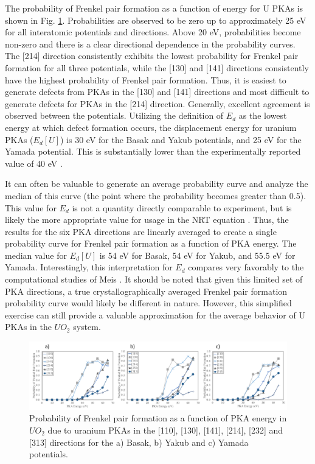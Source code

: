 \documentclass[8pt]{article}   	%
\begin{document}
The probability of Frenkel pair formation as a function of energy for U PKAs is shown in Fig. \ref{fig:fpu}. Probabilities are observed to be zero up to approximately 25 eV for all interatomic potentials and directions. Above 20 eV, probabilities become non-zero and there is a clear directional dependence in the probability curves. The [214] direction consistently exhibits the lowest probability for Frenkel pair formation for all three potentials, while the [130] and [141] directions consistently have the highest probability of Frenkel pair formation. Thus, it is easiest to generate defects from PKAs in the [130] and [141] directions and most difficult to generate defects for PKAs in the [214] direction. Generally, excellent agreement is observed between the potentials. Utilizing the definition of $E_d$ as the lowest energy at which defect formation occurs, the displacement energy for uranium PKAs ($E_d [U]$) is 30 eV for the Basak and Yakub potentials, and 25 eV for the Yamada potential. This is substantially lower than the experimentally reported value of 40 eV \cite{soullard1977,soullard1985}. 

It can often be valuable to generate an average probability curve and analyze the median of this curve (the point where the probability becomes greater than 0.5). This value for $E_{d}$ is not a quantity directly comparable to experiment, but is likely the more appropriate value for usage in the NRT equation \cite{nordlund2006, beelertde}. Thus, the results for the six PKA directions are linearly averaged to create a single probability curve for Frenkel pair formation as a function of PKA energy. The median value for $E_d [U]$ is 54 eV for Basak, 54 eV for Yakub, and 55.5 eV for Yamada. Interestingly, this interpretation for $E_{d}$ compares very favorably to the computational studies of Meis \cite{meis2005}. It should be noted that given this limited set of PKA directions, a true crystallographically averaged Frenkel pair formation probability curve would likely be different in nature. However, this simplified exercise can still provide a valuable approximation for the average behavior of U PKAs in the $UO_{2}$ system. 

\begin{figure}[h]
 \centering
 \includegraphics[width=1.0\textwidth]{FP_U.png} 
 \caption{Probability of Frenkel pair formation as a function of PKA energy in $UO_2$ due to uranium PKAs in the [110], [130], [141], [214], [232] and [313] directions for the a) Basak, b) Yakub and c) Yamada potentials.  }
 \label{fig:fpu}
\end{figure}
\end{document}
